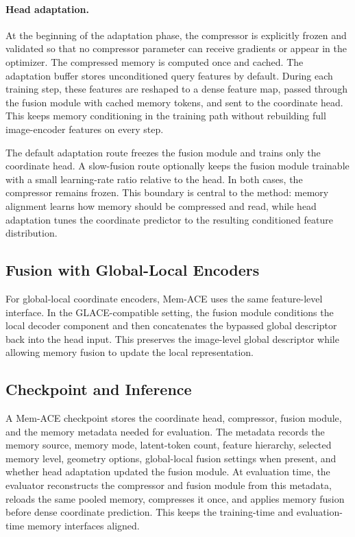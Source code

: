 \documentclass[letterpaper]{article} %
\newcommand{\shortmethod}{Mem-ACE}
\begin{document}
\paragraph{Head adaptation.}
At the beginning of the adaptation phase, the compressor is explicitly frozen and validated so that no compressor parameter can receive gradients or appear in the optimizer. The compressed memory is computed once and cached. The adaptation buffer stores unconditioned query features by default. During each training step, these features are reshaped to a dense feature map, passed through the fusion module with cached memory tokens, and sent to the coordinate head. This keeps memory conditioning in the training path without rebuilding full image-encoder features on every step.

The default adaptation route freezes the fusion module and trains only the coordinate head. A slow-fusion route optionally keeps the fusion module trainable with a small learning-rate ratio relative to the head. In both cases, the compressor remains frozen. This boundary is central to the method: memory alignment learns how memory should be compressed and read, while head adaptation tunes the coordinate predictor to the resulting conditioned feature distribution.

\subsection{Fusion with Global-Local Encoders}

For global-local coordinate encoders, \shortmethod{} uses the same feature-level interface. In the GLACE-compatible setting, the fusion module conditions the local decoder component and then concatenates the bypassed global descriptor back into the head input. This preserves the image-level global descriptor while allowing memory fusion to update the local representation.

\subsection{Checkpoint and Inference}

A \shortmethod{} checkpoint stores the coordinate head, compressor, fusion module, and the memory metadata needed for evaluation. The metadata records the memory source, memory mode, latent-token count, feature hierarchy, selected memory level, geometry options, global-local fusion settings when present, and whether head adaptation updated the fusion module. At evaluation time, the evaluator reconstructs the compressor and fusion module from this metadata, reloads the same pooled memory, compresses it once, and applies memory fusion before dense coordinate prediction. This keeps the training-time and evaluation-time memory interfaces aligned.
\end{document}
